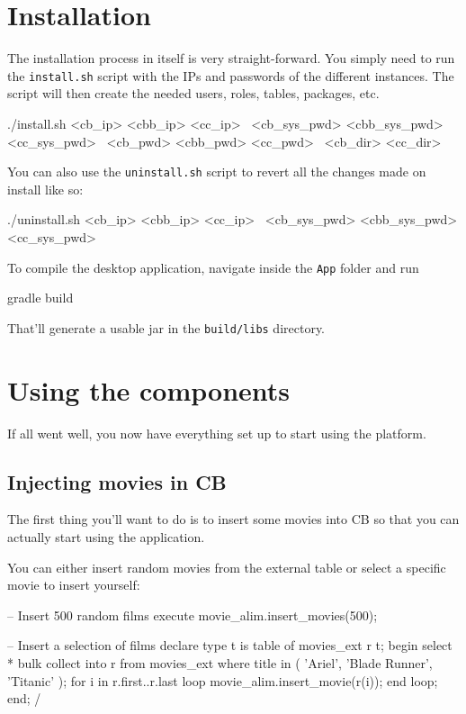 \documentclass[a4paper]{article}
\begin{document}
\section{Installation}

The installation process in itself is very straight-forward. You simply need to run the \texttt{install.sh} script with the IPs and passwords of the different instances. The script will then create the needed users, roles, tables, packages, etc.

\begin{shcode}
./install.sh <cb_ip> <cbb_ip> <cc_ip>       \
    <cb_sys_pwd> <cbb_sys_pwd> <cc_sys_pwd> \
    <cb_pwd> <cbb_pwd> <cc_pwd>             \
    <cb_dir> <cc_dir>
\end{shcode}

You can also use the \texttt{uninstall.sh} script to revert all the changes made on install like so:

\begin{shcode}
./uninstall.sh <cb_ip> <cbb_ip> <cc_ip> \
    <cb_sys_pwd> <cbb_sys_pwd> <cc_sys_pwd>
\end{shcode}

To compile the desktop application, navigate inside the \texttt{App} folder and run
\begin{shcode}
gradle build
\end{shcode}
That'll generate a usable jar in the \texttt{build/libs} directory.

\section{Using the components}

If all went well, you now have everything set up to start using the platform.

\subsection{Injecting movies in CB}

The first thing you'll want to do is to insert some movies into CB so that you can actually start using the application.\par
You can either insert random movies from the external table or select a specific movie to insert yourself:

\begin{sqlcode}
-- Insert 500 random films
execute movie_alim.insert_movies(500);

-- Insert a selection of films
declare
    type t is table of movies_ext%
    r t;
begin
    select * bulk collect into r from movies_ext where title in (
        'Ariel', 'Blade Runner', 'Titanic'
    );
    for i in r.first..r.last loop
        movie_alim.insert_movie(r(i));
    end loop;
end;
/
\end{sqlcode}
\end{document}
